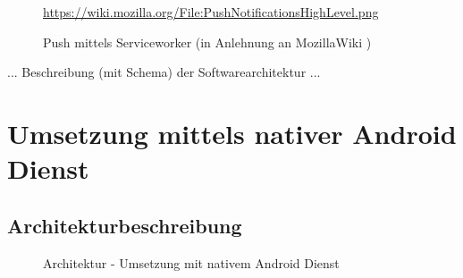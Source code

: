\begin{figure}[htp] 
\caption{Push mittels Serviceworker (in Anlehnung an MozillaWiki \cite{MOZ_WIKI})}
\quelle\url{https://wiki.mozilla.org/File:PushNotificationsHighLevel.png}
\label{image_architektur-serviceworker-push}
\end{figure}  

... Beschreibung (mit Schema) der Softwarearchitektur ...

\newpage
\section{Umsetzung mittels nativer Android Dienst}
\label{subsec_konzeption_android}

\subsection{Architekturbeschreibung}
\label{subsubsec_konzeption_android_architektur}

\begin{figure}[htp] 
\caption{Architektur - Umsetzung mit nativem Android Dienst }
\label{image_architektur-android-push}
\end{figure}  

